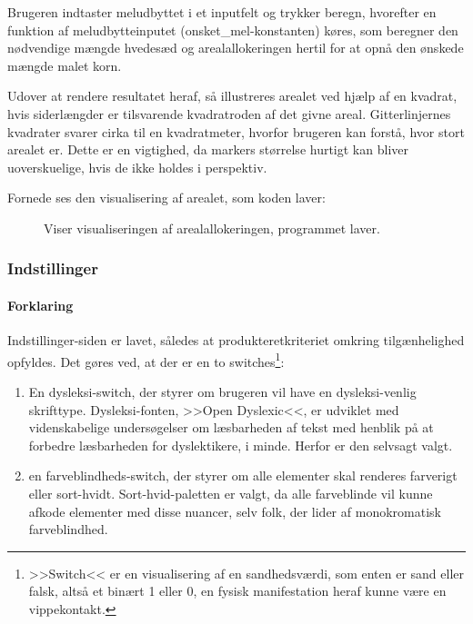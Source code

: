 Brugeren indtaster meludbyttet i et inputfelt og trykker beregn, hvorefter en funktion af meludbytteinputet (onsket\_mel-konstanten) køres, som beregner den nødvendige mængde hvedesæd og arealallokeringen hertil for at opnå den ønskede mængde malet korn.

Udover at rendere resultatet heraf, så illustreres arealet ved hjælp af en kvadrat, hvis siderlængder er tilsvarende kvadratroden af det givne areal. Gitterlinjernes kvadrater svarer cirka til en kvadratmeter, hvorfor brugeren kan forstå, hvor stort arealet er. Dette er en vigtighed, da markers størrelse hurtigt kan bliver uoverskuelige, hvis de ikke holdes i perspektiv.

Fornede ses den visualisering af arealet, som koden laver:

\begin{figure}[H]
    \centering
    \caption{Viser visualiseringen af arealallokeringen, programmet laver.}
    \label{fig:arealberegner}
\end{figure}

\subsubsection{Indstillinger}

\paragraph{Forklaring} Indstillinger-siden er lavet, således at produkteretkriteriet omkring tilgænhelighed opfyldes. Det gøres ved, at der er en to switches\footnote{>>Switch<< er en visualisering af en sandhedsværdi, som enten er sand eller falsk, \break altså et binært 1 eller 0, en fysisk manifestation heraf kunne være en vippekontakt.}:
\begin{enumerate}
    \item En dysleksi-switch, der styrer om brugeren vil have en dysleksi-venlig skrifttype. Dysleksi-fonten, >>Open Dyslexic<<, er udviklet med videnskabelige undersøgelser om læsbarheden af tekst med henblik på at forbedre læsbarheden for dyslektikere, i minde\cite{OpenDyslexic}. Herfor er den selvsagt valgt. 
    \item en farveblindheds-switch, der styrer om alle elementer skal renderes farverigt eller sort-hvidt. Sort-hvid-paletten er valgt, da alle farveblinde vil kunne afkode elementer med disse nuancer, selv folk, der lider af monokromatisk farveblindhed\cite{colourblindness_awareness}.
\end{enumerate}

